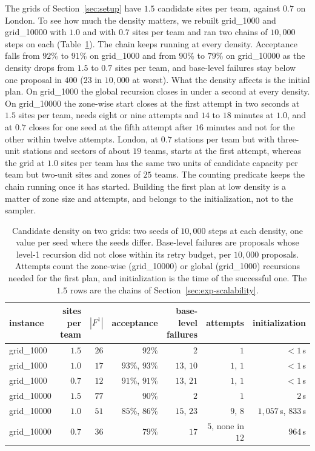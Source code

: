 \documentclass[preprint,12pt,authoryear]{elsarticle}
\theoremstyle{definition}
\begin{document}
The grids of Section~\ref{sec:setup} have $1.5$ candidate sites per team, against $0.7$ on London. To see how much the density matters, we rebuilt grid\_1000 and grid\_10000 with $1.0$ and with $0.7$ sites per team and ran two chains of $10{,}000$ steps on each (Table~\ref{tab:density}). The chain keeps running at every density. Acceptance falls from $92\%$ to $91\%$ on grid\_1000 and from $90\%$ to $79\%$ on grid\_10000 as the density drops from $1.5$ to $0.7$ sites per team, and base-level failures stay below one proposal in $400$ ($23$ in $10{,}000$ at worst). What the density affects is the initial plan. On grid\_1000 the global recursion closes in under a second at every density. On grid\_10000 the zone-wise start closes at the first attempt in two seconds at $1.5$ sites per team, needs eight or nine attempts and $14$ to $18$ minutes at $1.0$, and at $0.7$ closes for one seed at the fifth attempt after $16$ minutes and not for the other within twelve attempts. London, at $0.7$ stations per team but with three-unit stations and sectors of about $19$ teams, starts at the first attempt, whereas the grid at $1.0$ sites per team has the same two units of candidate capacity per team but two-unit sites and zones of $25$ teams. The counting predicate keeps the chain running once it has started. Building the first plan at low density is a matter of zone size and attempts, and belongs to the initialization, not to the sampler.

\begin{table}[!htbp]
\centering
\small
\begin{tabular}{lrrrrrr}
\toprule
instance & sites per team & $|F^1|$ & acceptance & base-level failures & attempts & initialization \\
\midrule
grid\_1000  & $1.5$ & $26$ & $92\%$ & $2$ & $1$ & $<1$\,s \\
grid\_1000  & $1.0$ & $17$ & $93\%$, $93\%$ & $13$, $10$ & $1$, $1$ & $<1$\,s \\
grid\_1000  & $0.7$ & $12$ & $91\%$, $91\%$ & $13$, $21$ & $1$, $1$ & $<1$\,s \\
grid\_10000 & $1.5$ & $77$ & $90\%$ & $2$ & $1$ & $2$\,s \\
grid\_10000 & $1.0$ & $51$ & $85\%$, $86\%$ & $15$, $23$ & $9$, $8$ & $1{,}057$\,s, $833$\,s \\
grid\_10000 & $0.7$ & $36$ & $79\%$ & $17$ & $5$, none in $12$ & $964$\,s \\
\bottomrule
\end{tabular}
\caption{Candidate density on two grids: two seeds of $10{,}000$ steps at each density, one value per seed where the seeds differ. Base-level failures are proposals whose level-1 recursion did not close within its retry budget, per $10{,}000$ proposals. Attempts count the zone-wise (grid\_10000) or global (grid\_1000) recursions needed for the first plan, and initialization is the time of the successful one. The $1.5$ rows are the chains of Section~\ref{sec:exp-scalability}.}
\label{tab:density}
\end{table}
\end{document}
